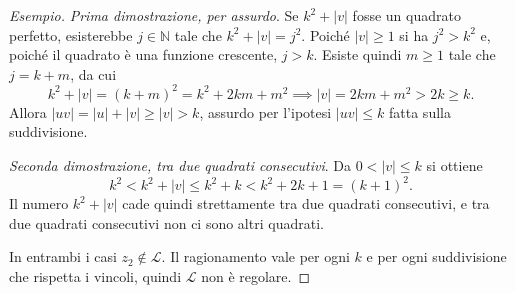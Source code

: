 \documentclass[a4paper, 11pt, oneside]{book}
\theoremstyle{formale}
\newenvironment{esempio}
    {\begin{proof}[\textit{Esempio}]\renewcommand{\qedsymbol}{$\diamond$}}
    {\end{proof}}
\begin{document}
\begin{esempio}
        \textit{Prima dimostrazione, per assurdo}. Se $k^2 + |v|$ fosse un quadrato
        perfetto, esisterebbe $j \in \mathbb{N}$ tale che $k^2 + |v| = j^2$. Poich\'e
        $|v| \geq 1$ si ha $j^2 > k^2$ e, poich\'e il quadrato \`e una funzione crescente,
        $j > k$. Esiste quindi $m \geq 1$ tale che $j = k + m$, da cui
        \begin{equation*}
            k^2 + |v| = (k + m)^2 = k^2 + 2km + m^2
            \implies |v| = 2km + m^2 > 2k \geq k.
        \end{equation*}
        Allora $|uv| = |u| + |v| \geq |v| > k$, assurdo per l'ipotesi $|uv| \leq k$ fatta
        sulla suddivisione.

        \textit{Seconda dimostrazione, tra due quadrati consecutivi}. Da $0 < |v| \leq k$
        si ottiene
        \begin{equation*}
            k^2 < k^2 + |v| \leq k^2 + k < k^2 + 2k + 1 = (k + 1)^2.
        \end{equation*}
        Il numero $k^2 + |v|$ cade quindi strettamente tra due quadrati consecutivi, e tra
        due quadrati consecutivi non ci sono altri quadrati.

        In entrambi i casi $z_2 \notin \mathcal{L}$. Il ragionamento vale per ogni $k$ e per
        ogni suddivisione che rispetta i vincoli, quindi $\mathcal{L}$ non \`e regolare.
    \end{esempio}
\end{document}
